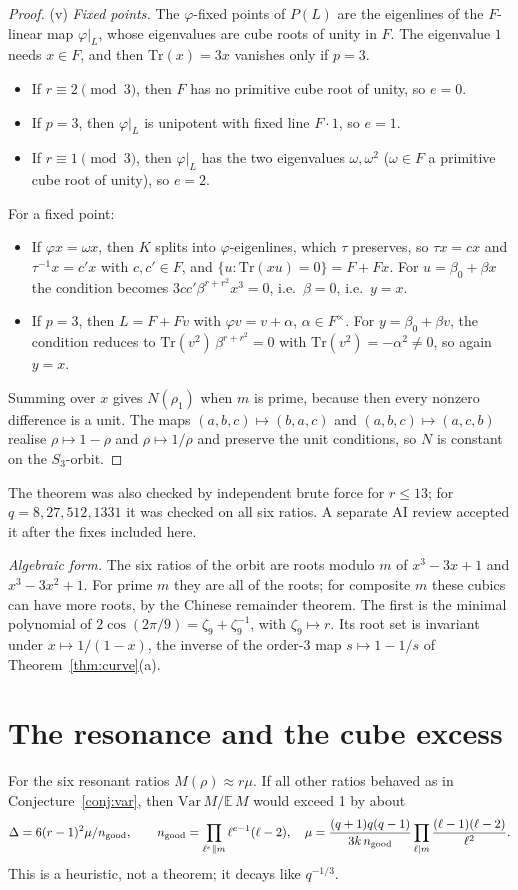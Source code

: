 \documentclass[11pt]{article}
\begin{document}
\begin{proof}
(v) \emph{Fixed points.} The $\varphi$-fixed points of $P(L)$ are the eigenlines of the $F$-linear map $\varphi|_L$, whose eigenvalues are cube roots of unity in $F$.
The eigenvalue $1$ needs $x\in F$, and then $\mathrm{Tr}(x)=3x$ vanishes only if $p=3$.
\begin{itemize}
\item If $r\equiv2\pmod3$, then $F$ has no primitive cube root of unity, so $e=0$.
\item If $p=3$, then $\varphi|_L$ is unipotent with fixed line $F\cdot1$, so $e=1$.
\item If $r\equiv1\pmod3$, then $\varphi|_L$ has the two eigenvalues $\omega,\omega^2$ ($\omega\in F$ a primitive cube root of unity), so $e=2$.
\end{itemize}
For a fixed point:
\begin{itemize}
\item If $\varphi x=\omega x$, then $K$ splits into $\varphi$-eigenlines, which $\tau$ preserves, so $\tau x=cx$ and $\tau^{-1}x=c'x$ with $c,c'\in F$, and $\{u:\mathrm{Tr}(xu)=0\}=F+Fx$.
For $u=\beta_0+\beta x$ the condition becomes $3cc'\beta^{r+r^2}x^3=0$, i.e.\ $\beta=0$, i.e.\ $y=x$.
\item If $p=3$, then $L=F+Fv$ with $\varphi v=v+\alpha$, $\alpha\in F^\times$. For $y=\beta_0+\beta v$, the condition reduces to $\mathrm{Tr}(v^2)\,\beta^{r+r^2}=0$ with $\mathrm{Tr}(v^2)=-\alpha^2\ne0$, so again $y=x$.
\end{itemize}
Summing over $x$ gives $N(\rho_1)$ when $m$ is prime, because then every nonzero difference is a unit.
The maps $(a,b,c)\mapsto(b,a,c)$ and $(a,b,c)\mapsto(a,c,b)$ realise $\rho\mapsto1-\rho$ and $\rho\mapsto1/\rho$ and preserve the unit conditions, so $N$ is constant on the $S_3$-orbit.
\end{proof}
The theorem was also checked by independent brute force for $r\le13$; for $q=8,27,512,1331$ it was checked on all six ratios. A separate AI review accepted it after the fixes included here.

\emph{Algebraic form.} The six ratios of the orbit are roots modulo $m$ of $x^3-3x+1$ and $x^3-3x^2+1$. For prime $m$ they are all of the roots;
for composite $m$ these cubics can have more roots, by the Chinese remainder theorem. The first is the minimal polynomial of $2\cos(2\pi/9)=\zeta_9+\zeta_9^{-1}$, with $\zeta_9\mapsto r$.
Its root set is invariant under $x\mapsto1/(1-x)$, the inverse of the order-3 map $s\mapsto1-1/s$ of Theorem~\ref{thm:curve}(a).

\section{The resonance and the cube excess}\label{sec:resblind}
For the six resonant ratios $M(\rho)\approx r\mu$. If all other ratios behaved as in Conjecture~\ref{conj:var}, then $\mathrm{Var}\,M/\mathbb E\,M$ would exceed 1 by about
\[\Delta=6(r-1)^2\mu/n_{\rm good},\qquad n_{\rm good}=\prod_{\ell^e\|m}\ell^{e-1}(\ell-2),\quad \mu=\frac{(q+1)q(q-1)}{3k\,n_{\rm good}}\prod_{\ell\mid m}\frac{(\ell-1)(\ell-2)}{\ell^2}.\]
This is a heuristic, not a theorem; it decays like $q^{-1/3}$.
\end{document}
